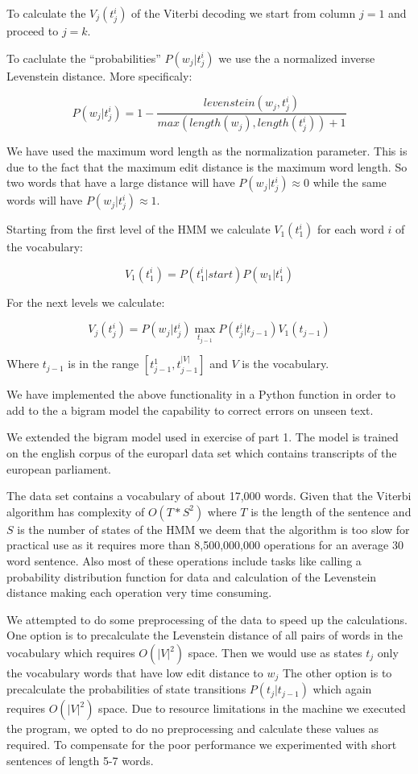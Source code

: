 \documentclass[a4paper]{article}
\begin{document}
To calculate the $V_j(t_j^i)$ of the Viterbi decoding we start from column $j=1$
and proceed to $j=k$.

To caclulate the ``probabilities'' $P(w_j|t_j^i)$ we use the a normalized
inverse Levenstein distance. More specificaly:

$$
P(w_j|t_j^i) = 1 - \frac{levenstein(w_j, t_j^i)}{max(length(w_j),
length(t_j^i)) + 1}
$$

We have used the maximum word length as the normalization parameter. This is due
to the fact that the maximum edit distance is the maximum word length. So two
words that have a large distance will have $P(w_j|t_j^i)\approx0$ while the same
words will have $P(w_j|t_j^i)\approx1$.

Starting from the first level of the HMM we calculate $V_1(t_1^i)$ for each word
$i$ of the vocabulary:

$$
V_1(t_1^i) = P(t_1^i|start)P(w_1|t_1^i)
$$

For the next levels we calculate:

$$
V_j(t_j^i) = P(w_j|t_j^i)\max_{t_{j-1}}P(t_j^i|t_{j-1})V_1(t_{j-1})
$$

Where $t_{j-1}$ is in the range $[t_{j-1}^1, t_{j-1}^{|V|}]$ and $V$ is the
vocabulary.

We have implemented the above functionality in a Python function in order to add
to the a bigram model the capability to correct errors on unseen text.

We extended the bigram model used in exercise of part 1. The model is trained on
the english corpus of the europarl data set which contains transcripts of the
european parliament. 

The data set contains a vocabulary of about 17,000 words. Given that the Viterbi
algorithm has complexity of $O(T*S^2)$ where $T$ is the length of the sentence
and $S$ is the number of states of the HMM we deem that the algorithm is too
slow for practical use as it requires more than 8,500,000,000 operations for an
average 30 word sentence. Also most of these operations include tasks like
calling a probability distribution function for data and calculation of the
Levenstein distance making each operation very time consuming.

We attempted to do some preprocessing of the data to speed up the calculations.
One option is to precalculate the Levenstein distance of all pairs of words in
the vocabulary which requires $O(|V|^2)$ space. Then we would use as states
$t_j$ only the vocabulary words that have low edit distance to $w_j$ The other
option is to precalculate the probabilities of state transitions
$P(t_j|t_{j-1})$ which again requires $O(|V|^2)$ space. Due to resource
limitations in the machine we executed the program, we opted to do no
preprocessing and calculate these values as required. To compensate for the poor
performance we experimented with short sentences of length 5-7 words.
\end{document}
